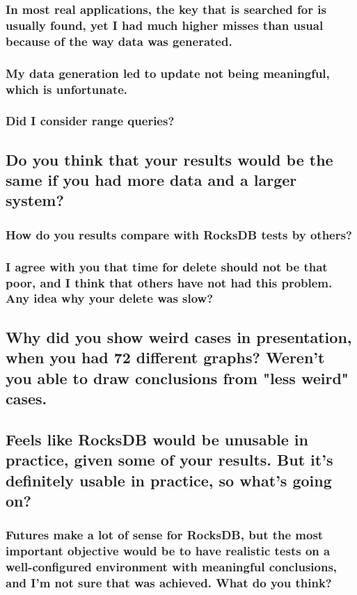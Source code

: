 \documentclass[twocolumn,11pt]{article}
\begin{document}
\subsubsection{In most real applications, the key that is searched for is usually
  found, yet I had much higher misses than usual because of the way data was
generated.}

\subsubsection{My data generation led to update not being meaningful, which is
unfortunate.}


\subsubsection{Did I consider range queries?}


\subsection{Do you think that your results would be the same if you had more
data and a larger system?}

\subsubsection{How do you results compare with RocksDB tests by others?}


\subsubsection{I agree with you that time for delete should not be that poor,
  and I think that others have not had this problem.  Any idea why your delete
was slow?}

\subsection{Why did you show weird cases in presentation, when you had 72
  different graphs?  Weren't you able to draw conclusions from "less weird"
cases.}


\subsection{Feels like RocksDB would be unusable in practice, given some of your
results.  But it's definitely usable in practice, so what's going on?}

\subsubsection{Futures make a lot of sense for RocksDB, but the most important
  objective would be to have realistic tests on a well-configured environment
  with meaningful conclusions, and I'm not sure that was achieved. What do you
think?}
\end{document}
